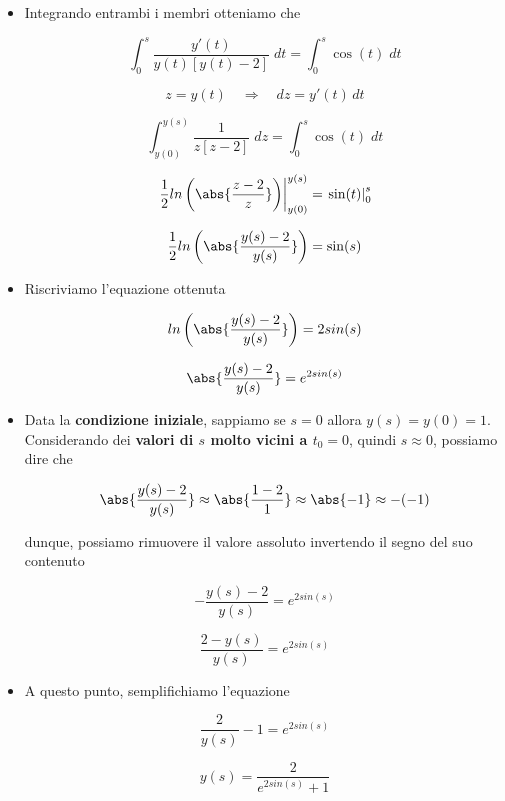 \documentclass[a4paper, 12pt]{report}
\begin{document}
\begin{itemize}
\begin{itemize}
            \[ \frac{y'(t)}{y(t)[y(t)-2]} = \cos(t)\]
            
            \item Integrando entrambi i membri otteniamo che
            
            \[ \int_{0}^{s} \frac{y'(t)}{y(t)[y(t)-2]} \; dt = \int_{0}^{s} \cos(t) \; dt\]
            
            \[ z = y(t) \quad \Longrightarrow \quad dz = y'(t) \, dt\]
            
            \[ \int_{y(0)}^{y(s)} \frac{1}{z[z-2]} \; dz = \int_{0}^{s} \cos(t) \; dt\]
            
            \[ \left . \frac{1}{2}ln \left (\abs{\frac{z-2}{z}} \right ) \right |_{y(0)}^{y(s)} = \left . \sin(t) \right |_{0}^{s}\]
            
            \[ \frac{1}{2}ln \left (\abs{\frac{y(s)-2}{y(s)}} \right ) = \sin(s)\]
            
            \item Riscriviamo l'equazione ottenuta
            
            \[ ln \left (\abs{\frac{y(s)-2}{y(s)}} \right ) = 2sin(s)\]
            
            \[ \abs{\frac{y(s)-2}{y(s)}}  = e^{2sin(s)}\]
            
            \item Data la \textbf{condizione iniziale}, sappiamo se $s = 0$ allora $y(s) = y(0) = 1$. Considerando dei \textbf{valori di $s$ molto vicini a $t_0 = 0$}, quindi $s \approx 0$, possiamo dire che
            
            \[ \abs{\frac{y(s)-2}{y(s)}} \approx \abs{\frac{1-2}{1}} \approx \abs{-1} \approx -(-1) \]
            
            dunque, possiamo rimuovere il valore assoluto invertendo il segno del suo contenuto
            
            \[ -\frac{y(s)-2}{y(s)}  = e^{2sin(s)}\]
            
            \[ \frac{2-y(s)}{y(s)}  = e^{2sin(s)}\]
            
            \item A questo punto, semplifichiamo l'equazione
            
            \[ \frac{2}{y(s)}-1  = e^{2sin(s)}\]
            
            \[ y(s) = \frac{2}{e^{2sin(s)}+1}\]
            
        \end{itemize}
        
    \end{itemize}
    
\end{document}
